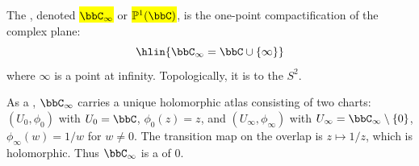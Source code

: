 \begin{definition} \label{definition:riemann_sphere}
    The , denoted \hl{$\bbC_\infty$} or \hl{$\mathbb{P}^1(\bbC)$}, is the one-point compactification of the complex plane:
    $$\hlin{\bbC_\infty = \bbC \cup \{\infty\}}$$
    where $\infty$ is a point at infinity. Topologically, it is  to the  $S^2$. 
    
    As a , $\bbC_\infty$ carries a unique holomorphic atlas consisting of two charts: $(U_0, \phi_0)$ with $U_0 = \bbC$, $\phi_0(z) = z$, and $(U_\infty, \phi_\infty)$ with $U_\infty = \bbC_\infty \setminus \{0\}$, $\phi_\infty(w) = 1/w$ for $w \neq 0$. The transition map on the overlap is $z \mapsto 1/z$, which is holomorphic. Thus $\bbC_\infty$ is a   of  $0$.
\end{definition}
